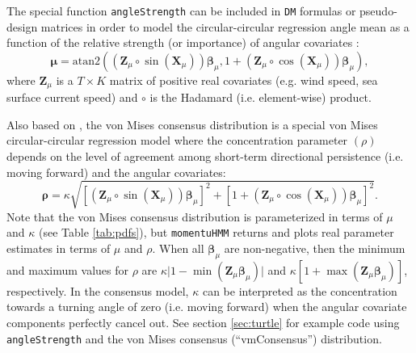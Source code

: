 \documentclass[12pt]{article}\usepackage[]{graphicx}\usepackage[]{color}
\begin{document}
The special function \verb|angleStrength| can be included in \verb|DM| formulas or pseudo-design matrices in order to model the circular-circular regression angle mean as a function of the relative strength (or importance) of angular covariates \citep{RivestEtAl2016}:
\begin{equation}
  {\boldsymbol \mu}=\text{atan2}(({\mathbf Z}_\mu \circ \sin({\mathbf X}_\mu)){\boldsymbol \beta}_\mu,1+({\mathbf Z}_\mu \circ \cos({\mathbf X}_\mu)){\boldsymbol \beta}_\mu),
  \label{eq:circ2}
\end{equation}
where ${\mathbf Z}_\mu$ is a $T \times K$ matrix of positive real covariates (e.g. wind speed, sea surface current speed) and $\circ$ is the Hadamard (i.e. element-wise) product.

Also based on \cite{RivestEtAl2016}, the von Mises consensus distribution is a special von Mises circular-circular regression model where the concentration parameter $(\rho)$ depends on the level of agreement among short-term directional persistence (i.e. moving forward) and the angular covariates:
\begin{equation}
  {\boldsymbol \rho}=\kappa \sqrt{\left[({\mathbf Z}_\mu \circ \sin({\mathbf X}_\mu)){\boldsymbol \beta}_\mu\right]^2+\left[1+({\mathbf Z}_\mu \circ \cos({\mathbf X}_\mu)){\boldsymbol \beta}_\mu\right]^2}.
  \label{eq:consensus}
\end{equation}
Note that the von Mises consensus distribution is parameterized in terms of $\mu$ and $\kappa$ (see Table \ref{tab:pdfs}), but \verb|momentuHMM| returns and plots real parameter estimates in terms of $\mu$ and $\rho$. When all ${\boldsymbol \beta}_\mu$ are non-negative, then the minimum and maximum values for $\rho$ are $\kappa \lvert 1-\min({\mathbf Z}_\mu {\boldsymbol \beta}_\mu) \rvert$ and $\kappa \left[1+\max({\mathbf Z}_\mu {\boldsymbol \beta}_\mu)\right]$, respectively.  In the consensus model, $\kappa$ can be interpreted as the concentration towards a turning angle of zero (i.e. moving forward) when the angular covariate components perfectly cancel out. %
See section \ref{sec:turtle} for example code using \verb|angleStrength| and the von Mises consensus (``vmConsensus'') distribution.
\end{document}
